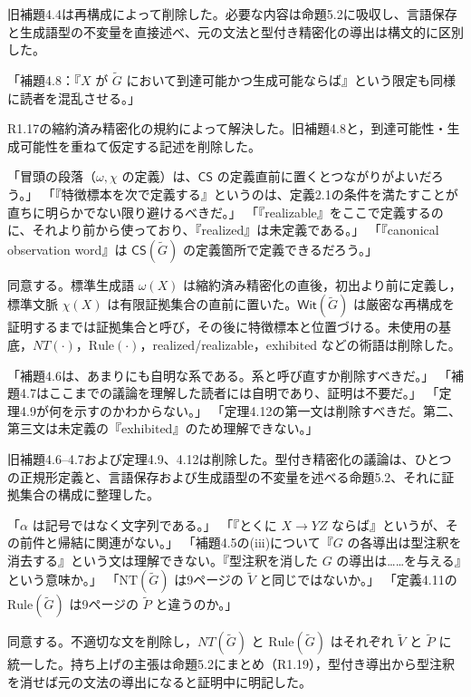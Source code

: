 \Reply
旧補題4.4は再構成によって削除した。必要な内容は命題5.2に吸収し、言語保存と生成語型の不変量を直接述べ、元の文法と型付き精密化の導出は構文的に区別した。

「補題4.8：『$X$ が $\widetilde G$ において到達可能かつ生成可能ならば』という限定も同様に読者を混乱させる。」

\Reply
R1.17の縮約済み精密化の規約によって解決した。旧補題4.8と，到達可能性・生成可能性を重ねて仮定する記述を削除した。

「冒頭の段落（$\omega,\chi$ の定義）は、$\mathsf{CS}$ の定義直前に置くとつながりがよいだろう。」
「『特徴標本を次で定義する』というのは、定義2.1の条件を満たすことが直ちに明らかでない限り避けるべきだ。」
「『realizable』をここで定義するのに、それより前から使っており、『realized』は未定義である。」
「『canonical observation word』は $\mathsf{CS}(\widetilde G)$ の定義箇所で定義できるだろう。」

\Reply
同意する。標準生成語 $\omega(X)$ は縮約済み精密化の直後，初出より前に定義し，標準文脈 $\chi(X)$ は有限証拠集合の直前に置いた。$\mathsf{Wit}(\widetilde G)$ は厳密な再構成を証明するまでは証拠集合と呼び，その後に特徴標本と位置づける。未使用の基底，$NT(\cdot)$，$\mathrm{Rule}(\cdot)$，realized/realizable，exhibited などの術語は削除した。

「補題4.6は、あまりにも自明な系である。系と呼び直すか削除すべきだ。」
「補題4.7はここまでの議論を理解した読者には自明であり、証明は不要だ。」
「定理4.9が何を示すのかわからない。」
「定理4.12の第一文は削除すべきだ。第二、第三文は未定義の『exhibited』のため理解できない。」

\Reply
旧補題4.6--4.7および定理4.9、4.12は削除した。型付き精密化の議論は、ひとつの正規形定義と、言語保存および生成語型の不変量を述べる命題5.2、それに証拠集合の構成に整理した。

「$\alpha$ は記号ではなく文字列である。」
「『とくに $X\to YZ$ ならば』というが、その前件と帰結に関連がない。」
「補題4.5の(iii)について『$G$ の各導出は型注釈を消去する』という文は理解できない。『型注釈を消した $G$ の導出は……を与える』という意味か。」
「$\mathrm{NT}(\widetilde G)$ は9ページの $\widetilde V$ と同じではないか。」
「定義4.11の $\mathrm{Rule}(\widetilde G)$ は9ページの $\widetilde P$ と違うのか。」

\Reply
同意する。不適切な文を削除し，$NT(\widetilde G)$ と $\mathrm{Rule}(\widetilde G)$ はそれぞれ $\widetilde V$ と $\widetilde P$ に統一した。持ち上げの主張は命題5.2にまとめ（R1.19），型付き導出から型注釈を消せば元の文法の導出になると証明中に明記した。

